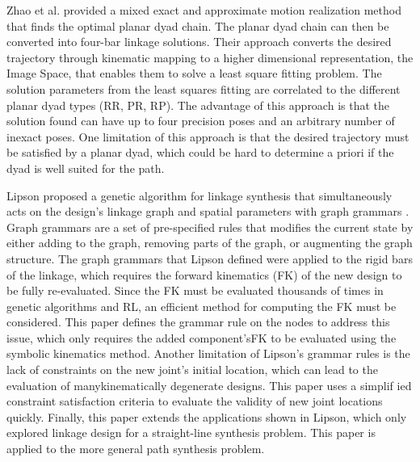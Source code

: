 Zhao et al. \cite{zhao_planar_2016} provided a mixed exact and approximate motion realization method that finds the optimal planar dyad chain. The planar dyad chain can then be converted into four-bar linkage solutions. Their approach converts the desired trajectory through kinematic mapping to a higher dimensional representation, the Image Space, that enables them to solve a least square fitting problem. The solution parameters from the least squares fitting are correlated to the different planar dyad types (RR, PR, RP). The advantage of this approach is that the solution found can have up to four precision poses and an arbitrary number of inexact poses. One limitation of this approach is that the desired trajectory must be satisfied by a planar dyad, which could be hard to determine a priori if the dyad is well suited for the path. 

Lipson proposed a genetic algorithm for linkage synthesis that simultaneously acts on the design’s linkage graph and spatial parameters with graph grammars \cite{lipson_evolutionary_2008}. Graph grammars are a set of pre-specified rules that modifies the current state by either adding to the graph, removing parts of the graph, or augmenting the graph structure. The graph grammars that Lipson defined were applied to the rigid bars of the linkage, which requires the forward kinematics (FK) of the new design to be fully re-evaluated. Since the FK must be evaluated thousands of times in genetic algorithms and RL, an efficient method for computing the FK must be considered. This paper defines the grammar rule on the nodes to address this issue, which only requires the added component’sFK to be evaluated using the symbolic kinematics method. Another limitation of Lipson’s grammar rules is the lack of constraints on the new joint’s initial location, which can lead to the evaluation of manykinematically degenerate designs. This paper uses a simplif ied constraint satisfaction criteria to evaluate the validity of new joint locations quickly. Finally, this paper extends the applications shown in Lipson, which only explored linkage design for a straight-line synthesis problem. This paper is applied to the more general path synthesis problem.

